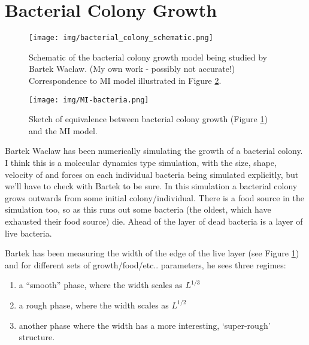 \documentclass[a4paper,10pt]{article}
\newcommand{\fref}[1]{Figure \ref{#1}}
\begin{document}
\newpage\phantom{blabla}
\newpage\phantom{blabla}
\newpage\phantom{blabla}
\newpage\phantom{blabla}
\newpage
\section{Bacterial Colony Growth}

\begin{figure}[h!]
 \centering
 \texttt{[image: img/bacterial\_colony\_schematic.png]}
 \caption{Schematic of the bacterial colony growth model being studied by Bartek Waclaw. (My own work - possibly not accurate!) Correspondence to MI model illustrated in \fref{fig:MI-bacteria}.}
 \label{fig:bacteria}
\end{figure}
\begin{figure}[h!]
 \centering
 \texttt{[image: img/MI-bacteria.png]}
 \caption{Sketch of equivalence between bacterial colony growth (\fref{fig:bacteria}) and the MI model.}
 \label{fig:MI-bacteria}
\end{figure}



Bartek Waclaw has been numerically simulating the growth of a bacterial colony. I think this is a molecular dynamics type simulation, with the size, shape, velocity of and forces on each individual bacteria being simulated explicitly, but we'll have to check with Bartek to be sure. In this simulation a bacterial colony grows outwards from some initial colony/individual. There is a food source in the simulation too, so as this runs out some bacteria (the oldest, which have exhausted their food source) die. Ahead of the layer of dead bacteria is a layer of live bacteria. 

Bartek has been measuring the width of the edge of the live layer (see \fref{fig:bacteria}) and for different sets of growth/food/etc.. parameters, he sees three regimes: 
\begin{enumerate}
 \item a ``smooth'' phase, where the width scales as $L^{1/3}$
 \item a rough phase, where the width scales as $L^{1/2}$
 \item another phase where the width has a more interesting, `super-rough' structure.
\end{enumerate}
\end{document}
